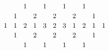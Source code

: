 \documentclass[border={10pt 10pt 10pt 10pt},varwidth]{standalone}
\begin{document}
\[\begin{tikzcd}[row sep={5mm,between origins},column sep={5mm,between origins}]
 &  & 1 &  & 1 &  & 1 &  & 1 &  & {} \\
 & 1 &  & 2 &  & 2 &  & 2 &  & 1 &  \\
1 & 1 & 2 & 1 & 3 & 2 & 3 & 1 & 2 & 1 & 1 \\
 & 1 &  & 2 &  & 2 &  & 2 &  & 1 &  \\
 &  & 1 &  & 1 &  & 1 &  & 1 &  & 
\end{tikzcd}\]
\end{document}
